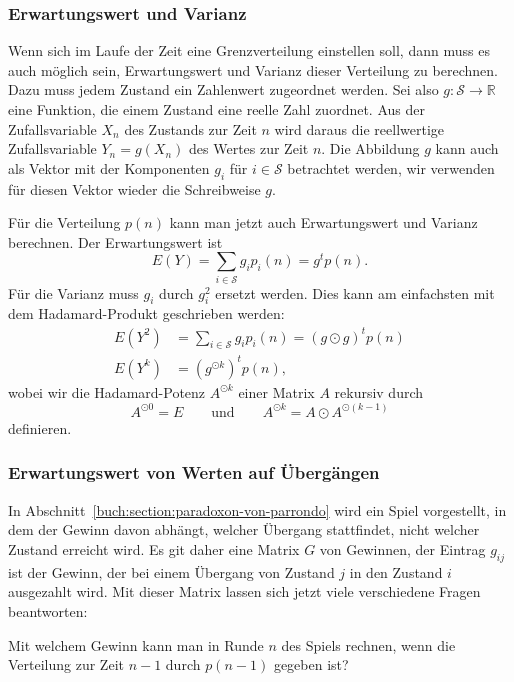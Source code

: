 \subsubsection{Erwartungswert und Varianz}
Wenn sich im Laufe der Zeit eine Grenzverteilung einstellen soll, dann
muss es auch möglich sein, Erwartungswert und Varianz dieser Verteilung
zu berechnen.
Dazu muss jedem Zustand ein Zahlenwert zugeordnet werden.
Sei also
\(
g: \mathcal{S}\to \mathbb{R}
\)
eine Funktion, die einem Zustand eine reelle Zahl zuordnet.
Aus der Zufallsvariable $X_n$ des Zustands zur Zeit $n$ wird daraus
die reellwertige Zufallsvariable $Y_n=g(X_n)$ des Wertes zur Zeit $n$.
Die Abbildung $g$ kann auch als Vektor mit der Komponenten $g_i$ 
für $i\in\mathcal{S}$ betrachtet werden, wir verwenden für diesen
Vektor wieder die Schreibweise $g$.

Für die Verteilung $p(n)$ kann man jetzt auch Erwartungswert und
Varianz berechnen.
Der Erwartungswert ist
\[
E(Y)
=
\sum_{i\in\mathcal{S}} g_i p_i(n)
=
g^t p(n).
\]
Für die Varianz muss $g_i$ durch $g_i^2$ ersetzt werden.
Dies kann am einfachsten mit dem Hadamard-Produkt geschrieben werden:
\begin{align*}
E(Y^2)
&=
\sum_{i\in\mathcal{S}} g_i p_i(n)
=
(g\odot g)^t p(n)
\\
E(Y^k)
&=
(g^{\odot k})^t p(n),
\end{align*}
wobei wir die Hadamard-Potenz $A^{\odot k}$ einer Matrix $A$ rekursiv
durch
\[
A^{\odot 0}=E
\qquad\text{und}\qquad
A^{\odot k} = A\odot A^{\odot (k-1)}
\]
definieren.

\subsubsection{Erwartungswert von Werten auf Übergängen}
In Abschnitt~\ref{buch:section:paradoxon-von-parrondo} wird ein Spiel
vorgestellt, in dem der Gewinn davon abhängt, welcher Übergang stattfindet,
nicht welcher Zustand erreicht wird.
Es git daher eine Matrix $G$ von Gewinnen, der Eintrag $g_{i\!j}$ ist
der Gewinn, der bei einem Übergang von Zustand $j$ in den Zustand $i$
ausgezahlt wird.
Mit dieser Matrix lassen sich jetzt viele verschiedene Fragen beantworten:

\begin{frage}
\label{buch:wahrscheinlichkeit:frage1}
Mit welchem Gewinn kann man in Runde $n$ des Spiels rechnen,
wenn die Verteilung zur Zeit $n-1$ durch $p(n-1)$ gegeben ist?
\end{frage}

